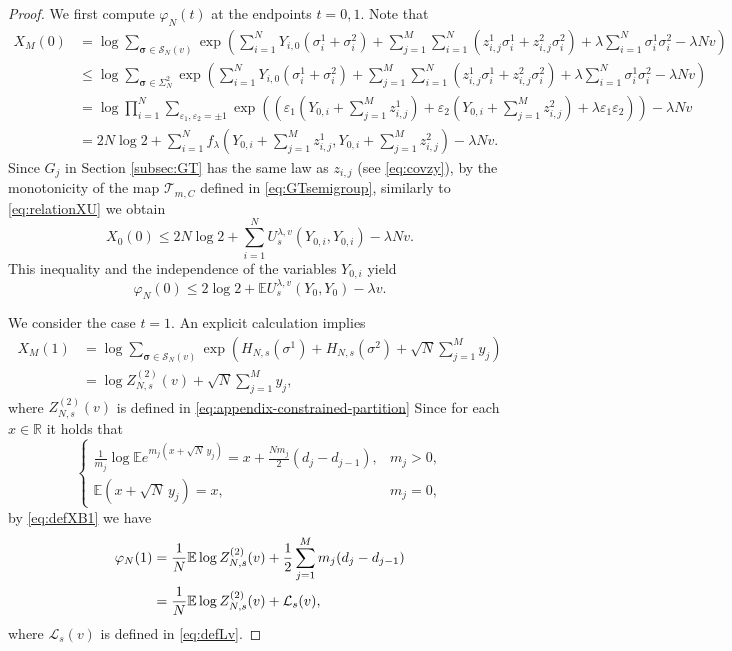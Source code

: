 \documentclass[11pt]{article}
\numberwithin{equation}{section}
\newcommand{\E}{\mathbb{E}}
\newcommand{\1}{\mathbf 1}
\begin{document}
\begin{proof}
We first compute $\varphi_N(t)$ at the endpoints $t=0,1$. 
Note that
\begin{align*}
X_M(0) &= \log\sum_{\boldsymbol\sigma\in{\mathcal{S}}_N(v)} \exp\left( \sum _{i=1}^N Y_{i,0}(\sigma _i^1 + \sigma _i^2) + \sum _{j=1}^M \sum _{i=1}^N (z_{i,j}^1 \sigma _i^1 + z_{i,j}^2 \sigma _i^2 ) +\lambda\sum_{i=1}^N\sigma_i^1\sigma_i^2-\lambda Nv \right) \\
%
&\leq \log \sum_{\boldsymbol\sigma \in\Sigma_N^2} \exp\left( \sum _{i=1}^N Y_{i,0}(\sigma _i^1 + \sigma _i^2) + \sum _{j=1}^M \sum _{i=1}^N (z_{i,j}^1 \sigma _i^1 + z_{i,j}^2 \sigma _i^2 ) +\lambda\sum_{i=1}^N\sigma_i^1\sigma_i^2-\lambda Nv \right) \\
%
&= \log \prod _{i=1}^N \sum _{\varepsilon _1, \varepsilon _2 = \pm 1}  \exp\left( \left( \varepsilon _1 \left( Y_{0,i} + \sum _{j=1}^M z_{i,j}^1 \right) + \varepsilon _2 \left( Y_{0,i} + \sum _{j=1}^M z_{i,j}^2 \right) + \lambda \varepsilon _1 \varepsilon _2 \right) \right) -\lambda N v \\
%
&= 2 N \log 2 + \sum _{i=1}^N f_\lambda \left( Y_{0,i} + \sum _{j=1}^M z_{i,j}^1 , Y_{0,i} + \sum _{j=1}^M z_{i,j}^2 \right) -\lambda N v .
\end{align*}
Since $G_j$ in Section \ref{subsec:GT} has the same law as $z_{i,j}$ (see \eqref{eq:covzy}), by the monotonicity of the map ${\mathcal T}_{m,C}$ defined in \eqref{eq:GTsemigroup}, similarly to \eqref{eq:relationXU} we obtain
\[
X_0(0) \leq 2 N \log 2 + \sum _{i=1}^N U_s^{\lambda ,v} (Y_{0,i}, Y_{0,i}) -\lambda N v .
\]
This inequality and the independence of the variables $Y_{0,i}$ yield 
\begin{equation}
\varphi_N(0)
\leq
2\log2+\E U_s^{\lambda,v}(Y_0,Y_0)-\lambda v.
\label{eq:GT-endpoint-zero}
\end{equation}

We consider  the case $t=1$.
An explicit calculation implies
\begin{align*}
X_M(1) &= \log \sum_{\boldsymbol\sigma\in{\mathcal{S}}_N(v)} \exp \left( H_{N,s}(\sigma ^1) + H_{N,s}(\sigma ^2) + \sqrt{N} \sum _{j=1}^M y_j\right) \\
%
&= \log Z_{N,s}^{(2)}(v) + \sqrt{N} \sum _{j=1}^M y_j,
\end{align*}
where $Z_{N,s}^{(2)}(v)$ is defined in \eqref{eq:appendix-constrained-partition}
Since for each $x\in {\mathbb R}$ it holds that
\[
\begin{cases}
\displaystyle
\frac1{m_j}\log\E e^{m_j(x+\sqrt N\,y_j)}
=x+\frac{Nm_j}{2}(d_j-d_{j-1}),&m_j>0,\\[3mm]
\displaystyle
\E (x+\sqrt N\,y_j)=x,&m_j=0 ,
\end{cases}
\]
by \eqref{eq:defXB1} we have
\begin{align}
\varphi_N(1)
&=\frac1N\E\log Z_{N,s}^{(2)}(v)+\frac12\sum_{j=1}^Mm_j(d_j-d_{j-1})
\notag\\
&=\frac1N\E\log Z_{N,s}^{(2)}(v)+\mathcal L_s(v),
\label{eq:GT-endpoint-one}
\end{align}
where $\mathcal L_s(v)$ is defined in \eqref{eq:defLv}.


\end{proof}
\end{document}
